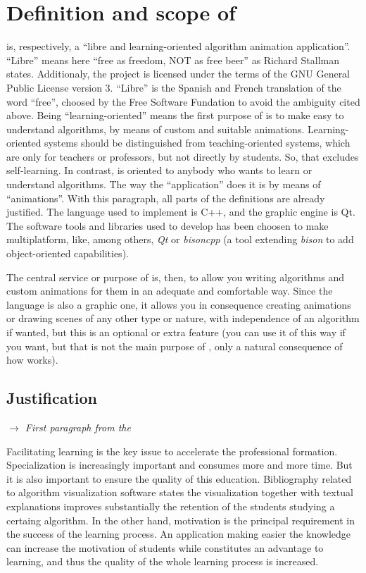 \documentclass{article}
\begin{document}
\section{Definition and scope of \fav}
\fav is, respectively, a ``libre and learning-oriented algorithm animation
application''. ``Libre'' means here ``free as freedom, NOT as free beer'' as
Richard Stallman states. Additionaly, the project is licensed under the terms of
the GNU General Public License version 3. ``Libre'' is the Spanish and French
translation of the word ``free'', choosed by the Free Software Fundation to
avoid the ambiguity cited above. Being ``learning-oriented'' means the first
purpose of \fav is to make easy to understand algorithms, by means of custom and
suitable animations. Learning-oriented systems should be distinguished from
teaching-oriented systems, which are only for teachers or professors, but not
directly by students. So, that excludes self-learning. In contrast, \fav is
oriented to anybody who wants to learn or understand algorithms. The way the
``application'' does it is by means of ``animations''. With this paragraph, all
parts of the definitions are already justified. The language used to implement
\fav is C++, and the graphic engine is Qt. The software tools and libraries used
to develop \fav has been choosen to make \fav multiplatform, like, among others,
\textit{Qt} or \textit{bisoncpp} (a tool extending \textit{bison} to add
object-oriented capabilities).

The central service or purpose of \fav is, then, to allow you writing
algorithms and custom animations for them in an adequate and comfortable
way. Since the language is also a graphic one, it allows you in consequence
creating animations or drawing scenes of any other type or nature, with
independence of an algorithm if wanted, but this is an optional or extra feature
(you can use it of this way if you want, but that is not the main purpose of
\fav, only a natural consequence of how \fav works).

\subsection{Justification}
\label{ssec:justification}
\vspace*{-2ex}\hspace*{3.4em}\textit{\scriptsize{$\rightarrow$ First paragraph
    from the \favc}}

Facilitating learning is the key issue to accelerate the professional
formation. Specialization is increasingly important and consumes more
and more time. But it is also important to ensure the quality of this
education. Bibliography related to algorithm visualization
software states the visualization together with textual explanations
improves substantially the retention of the students studying a
certaing algorithm. In the other hand, motivation is the
principal requirement in the success of the learning process. An
application making easier the knowledge can increase the motivation of
students while constitutes an advantage to learning, and thus the
quality of the whole learning process is increased.
\end{document}
